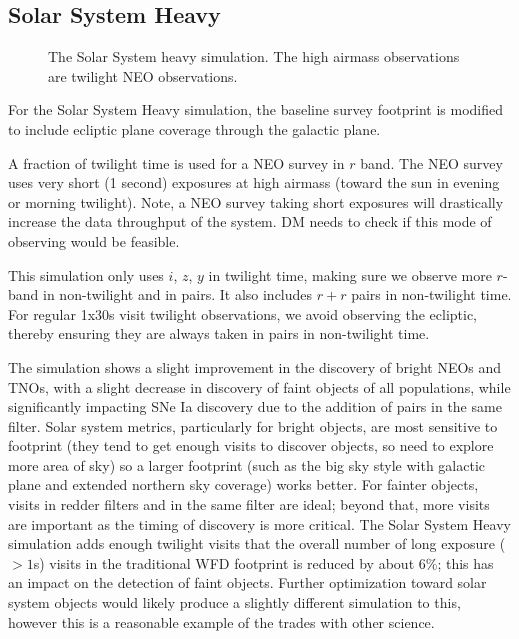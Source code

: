 \subsection{Solar System Heavy}\label{ss:1.6solarsystemheavy}
\begin{figure}
\caption{The Solar System heavy simulation. The high airmass observations are twilight NEO observations.}\label{fig:ssheavy}
\end{figure}

For the Solar System Heavy simulation, the baseline survey footprint is modified to include ecliptic plane coverage through the galactic plane.

A fraction of twilight time is used for a NEO survey in $r$ band. The NEO survey uses very short (1 second) exposures at high airmass (toward the sun in evening or morning twilight). Note, a NEO survey taking short exposures will drastically increase the data throughput of the system. DM needs to check if this mode of observing would be feasible.  %

This simulation only uses $i$, $z$, $y$ in twilight time, making sure we observe more $r$-band in non-twilight and in pairs. It also includes $r+r$ pairs in non-twilight time.  For regular 1x30s visit twilight observations, we avoid observing the ecliptic, thereby ensuring they are always taken in pairs in non-twilight time.

The simulation shows a slight improvement in the discovery of bright NEOs and TNOs, with a slight decrease in discovery of faint objects of all populations, while significantly impacting SNe Ia discovery due to the addition of pairs in the same filter. Solar system metrics, particularly for bright objects, are most sensitive to footprint (they tend to get enough visits to discover objects, so need to explore more area of sky) so a larger footprint (such as the big sky style with galactic plane and extended northern sky coverage) works better. For fainter objects, visits in redder filters and in the same filter are ideal; beyond that, more visits are important as the timing of discovery is more critical. The Solar System Heavy simulation adds enough twilight visits that the overall number of long exposure ($>1$s) visits in the traditional WFD footprint is reduced by about 6\%; this has an impact on the detection of faint objects. Further optimization toward solar system objects would likely produce a slightly different simulation to this, however this is a reasonable example of the trades with other science. 


